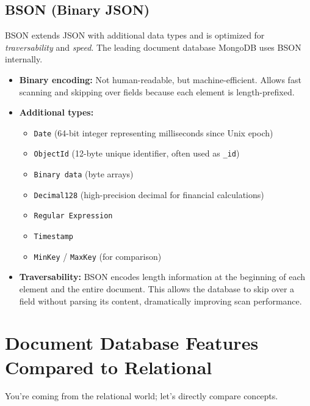 \documentclass[12pt,a4paper]{article}
\begin{document}
\subsection{BSON (Binary JSON)}
BSON extends JSON with additional data types and is optimized for \textit{traversability} and \textit{speed}. The leading document database MongoDB uses BSON internally.
\begin{itemize}
    \item \textbf{Binary encoding:} Not human-readable, but machine-efficient. Allows fast scanning and skipping over fields because each element is length-prefixed.
    \item \textbf{Additional types:}
    \begin{itemize}[noitemsep]
        \item \texttt{Date} (64-bit integer representing milliseconds since Unix epoch)
        \item \texttt{ObjectId} (12-byte unique identifier, often used as \texttt{\_id})
        \item \texttt{Binary data} (byte arrays)
        \item \texttt{Decimal128} (high-precision decimal for financial calculations)
        \item \texttt{Regular Expression}
        \item \texttt{Timestamp}
        \item \texttt{MinKey} / \texttt{MaxKey} (for comparison)
    \end{itemize}
    \item \textbf{Traversability:} BSON encodes length information at the beginning of each element and the entire document. This allows the database to skip over a field without parsing its content, dramatically improving scan performance.
\end{itemize}

\section{Document Database Features Compared to Relational}
You're coming from the relational world; let's directly compare concepts.
\end{document}
